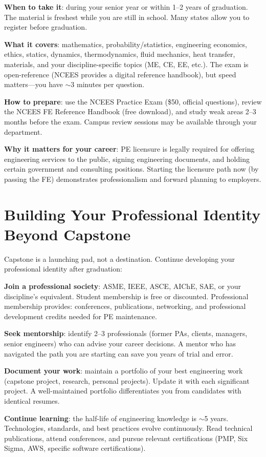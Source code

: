 \textbf{When to take it}: during your senior year or within 1--2 years of graduation. The material is freshest while you are still in school. Many states allow you to register before graduation.

\textbf{What it covers}: mathematics, probability/statistics, engineering economics, ethics, statics, dynamics, thermodynamics, fluid mechanics, heat transfer, materials, and your discipline-specific topics (ME, CE, EE, etc.). The exam is open-reference (NCEES provides a digital reference handbook), but speed matters---you have $\sim$3 minutes per question.

\textbf{How to prepare}: use the NCEES Practice Exam (\$50, official questions), review the NCEES FE Reference Handbook (free download), and study weak areas 2--3 months before the exam. Campus review sessions may be available through your department.

\textbf{Why it matters for your career}: PE licensure is legally required for offering engineering services to the public, signing engineering documents, and holding certain government and consulting positions. Starting the licensure path now (by passing the FE) demonstrates professionalism and forward planning to employers.

\section{Building Your Professional Identity Beyond Capstone}
Capstone is a launching pad, not a destination. Continue developing your professional identity after graduation:

\textbf{Join a professional society}: ASME, IEEE, ASCE, AIChE, SAE, or your discipline's equivalent. Student membership is free or discounted. Professional membership provides: conferences, publications, networking, and professional development credits needed for PE maintenance.

\textbf{Seek mentorship}: identify 2--3 professionals (former PAs, clients, managers, senior engineers) who can advise your career decisions. A mentor who has navigated the path you are starting can save you years of trial and error.

\textbf{Document your work}: maintain a portfolio of your best engineering work (capstone project, research, personal projects). Update it with each significant project. A well-maintained portfolio differentiates you from candidates with identical resumes.

\textbf{Continue learning}: the half-life of engineering knowledge is $\sim$5 years. Technologies, standards, and best practices evolve continuously. Read technical publications, attend conferences, and pursue relevant certifications (PMP, Six Sigma, AWS, specific software certifications).



